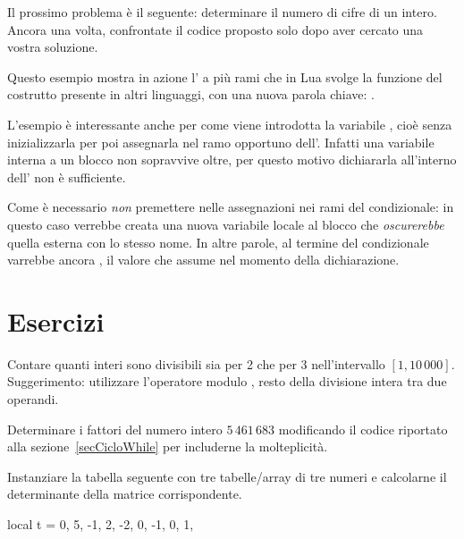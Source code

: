 Il prossimo problema è il seguente: determinare il numero di cifre di un
intero. Ancora una volta, confrontate il codice proposto solo dopo aver cercato
una vostra soluzione.

Questo esempio mostra in azione l' a più rami che in Lua svolge la
funzione del costrutto  presente in altri linguaggi, con una nuova
parola chiave: .

L'esempio è interessante anche per come viene introdotta la variabile
, cioè senza inizializzarla per poi assegnarla nel ramo opportuno
dell'. Infatti una variabile interna a un blocco non sopravvive oltre,
per questo motivo dichiararla all'interno dell' non è sufficiente.

Come è necessario \emph{non} premettere  nelle assegnazioni nei rami
del condizionale: in questo caso verrebbe creata una nuova variabile locale al
blocco che \emph{oscurerebbe} quella esterna con lo stesso nome. In altre
parole, al termine del condizionale  varrebbe ancora , il
valore che assume nel momento della dichiarazione.


\section{Esercizi}

\begin{Exercise}[label=cos-01]
Contare quanti interi sono divisibili sia per 2 che per 3 nell'intervallo \( [1,
10\,000]\). Suggerimento: utilizzare l'operatore modulo \key{\%}, resto della
divisione intera tra due operandi.
\end{Exercise}

\begin{Exercise}[label=cos-02]
Determinare i fattori del numero intero \(5\,461\,683\) modificando il codice
riportato alla sezione~\ref{secCicloWhile} per includerne la molteplicità.
\end{Exercise}

\begin{Exercise}[label=cos-03]
Instanziare la tabella seguente con tre tabelle/array di tre numeri e calcolarne
il determinante della matrice corrispondente.
\begin{lines}
local t = {
    { 0,  5, -1},
    { 2, -2,  0},
    {-1,  0,  1},
}
\end{lines}
\end{Exercise}

